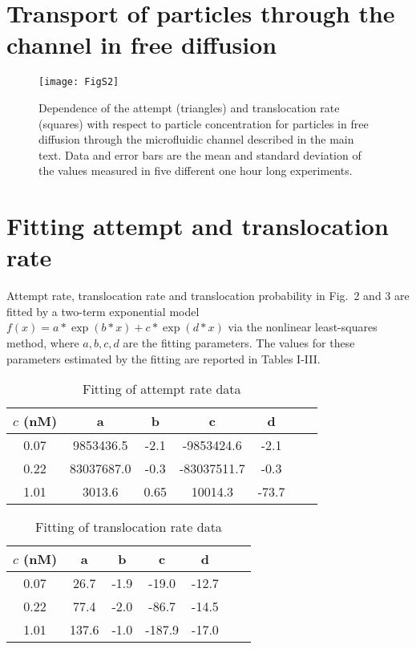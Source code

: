 \documentclass[
 reprint,
 aps, showkeys, showpacs
]{revtex4-1}
\begin{document}
\section{Transport of particles through the channel in free diffusion}\label{appendix2}
\begin{figure}[H]
	\texttt{[image: FigS2]}
	\caption{Dependence of the attempt (triangles) and translocation rate (squares) with respect to particle concentration for particles in free diffusion through the microfluidic channel described in the main text. Data and error bars are the mean and standard deviation of the values measured in five different one hour long experiments.}
\end{figure}

\section{Fitting attempt and translocation rate}\label{appendix3}

Attempt rate, translocation rate and translocation probability in Fig.~2 and 3 are fitted by a two-term exponential model $f(x) = a*\exp(b*x) + c*\exp(d*x)$ via the nonlinear least-squares method, where $a,b,c,d$ are the fitting parameters. The values for these parameters estimated by the fitting are reported in Tables I-III.
\begin{table}[H]
	\caption{Fitting of attempt rate data}
	\begin{ruledtabular}
		\begin{tabular}{ccccccc}
			$c$ (nM)& a& b& c&  d 
			\\
			\hline
			0.07& 9853436.5& -2.1& -9853424.6& -2.1\\
			0.22& 83037687.0& -0.3& -83037511.7& -0.3\\
			1.01& 3013.6& 0.65& 10014.3& -73.7\\
		\end{tabular}
	\end{ruledtabular}
\end{table}

\begin{table}[H]
	\caption{Fitting of translocation rate data}
	\begin{ruledtabular}
		\begin{tabular}{ccccccc}
			$c$ (nM)& a& b& c&  d 
			\\
			\hline
			0.07& 26.7& -1.9& -19.0& -12.7\\
			0.22& 77.4& -2.0& -86.7& -14.5\\
			1.01& 137.6& -1.0& -187.9& -17.0\\
		\end{tabular}
	\end{ruledtabular}
\end{table}
\end{document}
